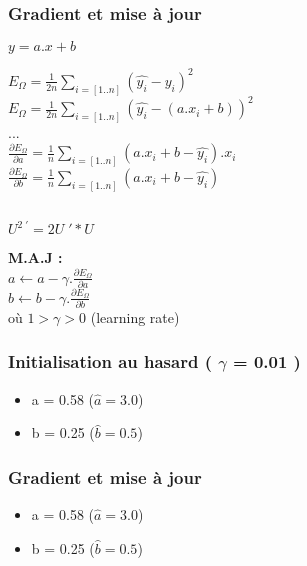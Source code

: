 \begin{frame}
  \frametitle{Gradient et mise à jour}
  \begin{minipage}[l]{0.49\linewidth}
    \begin{center}
      $\boxed{y = a.x+b}$ \\
    \end{center}
    $E_{\Omega} = \frac{1}{2n}\underset{i=[1..n]}{\sum}( \hat{y_i} - y_i )^2$ \\
    $E_{\Omega} = \frac{1}{2n}\underset{i=[1..n]}{\sum}( \hat{y_i} - (a.x_i+b) )^2$ \\
    ... \\
    $\frac{\partial{E_{\Omega}}}{\partial{a}} = \frac{1}{n}\sum_{i=[1..n]}(a.x_i+b - \hat{y_i}).x_i$ \\
    $\frac{\partial{E_{\Omega}}}{\partial{b}} = \frac{1}{n}\sum_{i=[1..n]}(a.x_i+b - \hat{y_i})$ \\
  \end{minipage}\hfill
  \begin{minipage}[c]{0.49\linewidth}
    $\;$ \\
    $\;$ \\
    $\;$ \\
    \begin{center}
      $\boxed{U^{2\;\prime}=2U\;'*U}$
    \end{center}
  \end{minipage}\hfill
  \begin{center}
    \textbf{M.A.J :} \\
    $\;$ \\
    $a \leftarrow a - \gamma.\frac{\partial{E_{\Omega}}}{\partial{a}}$ \\
    $b \leftarrow b - \gamma.\frac{\partial{E_{\Omega}}}{\partial{b}}$ \\
    $\;$ \\
    où $1 > \gamma > 0$ (learning rate)
  \end{center}
\end{frame}

\begin{frame}
  \frametitle{Initialisation au hasard ( $\gamma$ = 0.01 )}
  \begin{itemize}
  \item a = 0.58 ($\hat{a} = 3.0$)
  \item b = 0.25 ($\hat{b} = 0.5$)
  \end{itemize}
\end{frame}

\begin{frame}
  \frametitle{Gradient et mise à jour}
  \begin{itemize}
  \item a = 0.58 ($\hat{a} = 3.0$)
  \item b = 0.25 ($\hat{b} = 0.5$)
  \end{itemize}
\end{frame}


